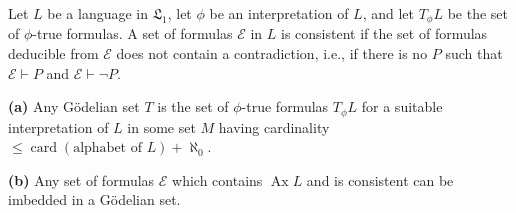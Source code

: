 Let $L$ be a language in $\mathfrak{L}_1$, let $\phi$ be an interpretation of $L$, and let $T_\phi L$ be the set of $\phi$-true formulas. A set of formulas $\mathcal{E}$ in $L$ is consistent if the set of formulas deducible from $\mathcal{E}$ does not contain a contradiction, i.e., if there is no $P$ such that $\mathcal{E} \vdash P$ and $\mathcal{E} \vdash \neg P$.

\textbf{(a)} Any Gödelian set $T$ is the set of $\phi$-true formulas $T_{\phi}L$ for a suitable interpretation of $L$ in some set $M$ having cardinality $\leqslant \operatorname{card}(\text{alphabet of } L) + \aleph_0$.

\textbf{(b)} Any set of formulas $\mathcal{E}$ which contains $\operatorname{Ax} L$ and is consistent can be imbedded in a Gödelian set.
